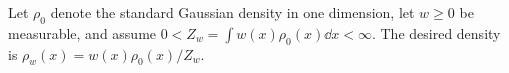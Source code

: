 \documentclass[12pt,a4paper,oneside]{book}
\begin{document}
\begin{example}
\label{ex:target-transport}
\label{src:p9q14}
\begin{Question}
Let $\rho_0$ denote the standard Gaussian density in one dimension,
let $w\ge0$ be measurable, and assume
$0<Z_w=\int w(x)\rho_0(x)\dd x<\infty$.
The desired density is $\rho_w(x)=w(x)\rho_0(x)/Z_w$.
\end{Question}

\end{example}
\end{document}
